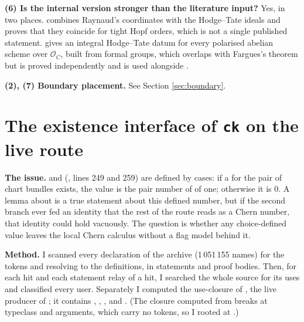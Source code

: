 \documentclass[11pt]{article}
\newcommand{\cO}{\mathcal O}
\theoremstyle{remark}
\begin{document}
\textbf{(6) Is the internal version stronger than the literature input?} Yes, in two places.  combines Raynaud's coordinates with the Hodge--Tate ideals and proves that they coincide for tight Hopf orders, which is not a single published statement.  gives an integral Hodge--Tate datum for every polarised abelian scheme over $\cO_C$, built from formal groups, which overlaps with Fargues's theorem but is proved independently and is used alongside .

\textbf{(2), (7) Boundary placement.} See Section \ref{sec:boundary}.


\section{The existence interface of \texttt{ck} on the live route}\label{sec:ckif}

\textbf{The issue.}  and  (, lines 249 and 259) are defined by cases: if a  for the pair of chart bundles exists, the value is the pair number of  of one; otherwise it is $0$. A lemma about  is a true statement about this defined number, but if the second branch ever fed an identity that the rest of the route reads as a Chern number, that identity could hold vacuously. The question is whether any choice-defined value leaves the local Chern calculus without a flag model behind it.

\textbf{Method.} I scanned every declaration of the archive (1\,051\,155 names) for the tokens  and  resolving to the  definitions, in statements and proof bodies. Then, for each hit and each statement relay of a hit, I searched the whole source for its uses and classified every user. Separately I computed the use-closure of , the live producer of ; it contains , , ,  and . (The closure computed from  breaks at typeclass and  arguments, which carry no tokens, so I rooted at .)
\end{document}
